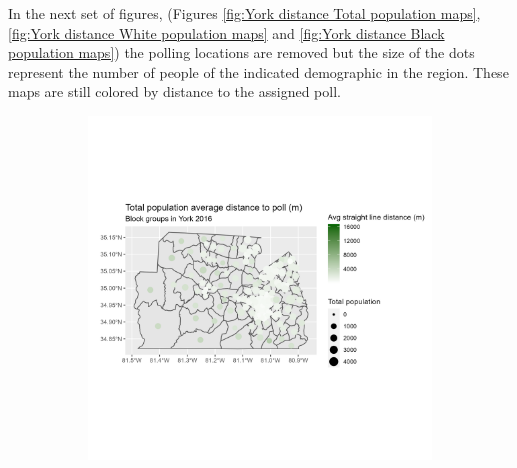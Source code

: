 \documentclass[11pt]{article}
\theoremstyle{remark}
\theoremstyle{definition}
\begin{document}
In the next set of figures, (Figures \ref{fig:York distance Total population maps}, \ref{fig:York distance White population maps} and \ref{fig:York distance Black population maps})  the polling locations are removed but the size of the dots represent the number of people of the indicated demographic in the region. These maps are still colored by distance to the assigned poll.

\begin{figure}
	\begin{subfigure}{.5\textwidth}
		\centering
		\includegraphics[width=\linewidth]{result_analysis/York_County_SC_original_configs/population_pop_and_dist_York_config_original_2016_polls.png}
		\label{sfig:York_2016_bg_dist_pop}
	\end{subfigure} 
	\begin{subfigure}{.5\textwidth}
		\centering

\end{subfigure}
\end{figure}
\end{document}

